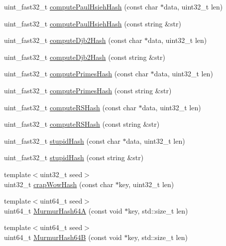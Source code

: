 \begin{DoxyCompactItemize}
uint\+\_\+fast32\+\_\+t \hyperlink{namespaceuva_1_1smt_1_1hashing_a6c3fa130e885dfb598755d0a0374bb55}{compute\+Paul\+Hsieh\+Hash} (const char $\ast$data, uint32\+\_\+t len)
\item 
uint\+\_\+fast32\+\_\+t \hyperlink{namespaceuva_1_1smt_1_1hashing_a5dddda6049bbe46b8de0196c32b8ed88}{compute\+Paul\+Hsieh\+Hash} (const string \&str)
\item 
uint\+\_\+fast32\+\_\+t \hyperlink{namespaceuva_1_1smt_1_1hashing_a6acd19fa0ec401ebcf83bddb084868a2}{compute\+Djb2\+Hash} (const char $\ast$data, uint32\+\_\+t len)
\item 
uint\+\_\+fast32\+\_\+t \hyperlink{namespaceuva_1_1smt_1_1hashing_a831b522e0defd7f2fb98e4659c238233}{compute\+Djb2\+Hash} (const string \&str)
\item 
uint\+\_\+fast32\+\_\+t \hyperlink{namespaceuva_1_1smt_1_1hashing_aa7ec4be33256ab5f88807cf253aa64f0}{compute\+Primes\+Hash} (const char $\ast$data, uint32\+\_\+t len)
\item 
uint\+\_\+fast32\+\_\+t \hyperlink{namespaceuva_1_1smt_1_1hashing_aba060665a729921116e2d55ec06b571e}{compute\+Primes\+Hash} (const string \&str)
\item 
uint\+\_\+fast32\+\_\+t \hyperlink{namespaceuva_1_1smt_1_1hashing_a769ad382d3dbb50f27cdb8e834c0f8ba}{compute\+R\+S\+Hash} (const char $\ast$data, uint32\+\_\+t len)
\item 
uint\+\_\+fast32\+\_\+t \hyperlink{namespaceuva_1_1smt_1_1hashing_a6fd5b042010c6cb97387719407ca7552}{compute\+R\+S\+Hash} (const string \&str)
\item 
uint\+\_\+fast32\+\_\+t \hyperlink{namespaceuva_1_1smt_1_1hashing_ac90e791feb022e306f9a587f38634929}{stupid\+Hash} (const char $\ast$data, uint32\+\_\+t len)
\item 
uint\+\_\+fast32\+\_\+t \hyperlink{namespaceuva_1_1smt_1_1hashing_a90bf2bab20f065c7693da46a1d776cc3}{stupid\+Hash} (const string \&str)
\item 
{\footnotesize template$<$uint32\+\_\+t seed$>$ }\\uint32\+\_\+t \hyperlink{namespaceuva_1_1smt_1_1hashing_a7f5c6b8537cc241d515c16782d7e7732}{crap\+Wow\+Hash} (const char $\ast$key, uint32\+\_\+t len)
\item 
{\footnotesize template$<$uint64\+\_\+t seed$>$ }\\uint64\+\_\+t \hyperlink{namespaceuva_1_1smt_1_1hashing_aab30ac60ac5c660503b4b736df2896f2}{Murmur\+Hash64\+A} (const void $\ast$key, std\+::size\+\_\+t len)
\item 
{\footnotesize template$<$uint64\+\_\+t seed$>$ }\\uint64\+\_\+t \hyperlink{namespaceuva_1_1smt_1_1hashing_a3da1f706ea51c541ff3c1c1634dadb38}{Murmur\+Hash64\+B} (const void $\ast$key, std\+::size\+\_\+t len)

\end{DoxyCompactItemize}
